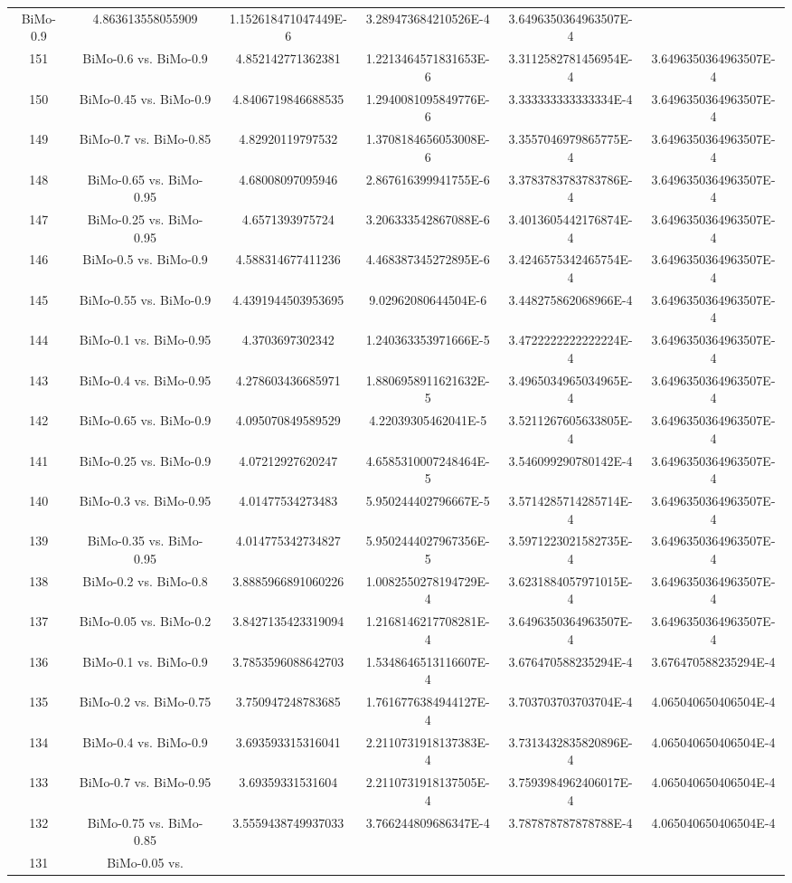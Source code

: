 \documentclass[a4paper,10pt]{article}
\begin{document}
\begin{landscape}
\begin{table}[!htp]
\begin{tabular}{cccccc}
BiMo-0.9&4.863613558055909&1.152618471047449E-6&3.289473684210526E-4&3.6496350364963507E-4\\151&BiMo-0.6 vs. BiMo-0.9&4.852142771362381&1.2213464571831653E-6&3.3112582781456954E-4&3.6496350364963507E-4\\150&BiMo-0.45 vs. BiMo-0.9&4.8406719846688535&1.2940081095849776E-6&3.333333333333334E-4&3.6496350364963507E-4\\149&BiMo-0.7 vs. BiMo-0.85&4.82920119797532&1.3708184656053008E-6&3.3557046979865775E-4&3.6496350364963507E-4\\148&BiMo-0.65 vs. BiMo-0.95&4.68008097095946&2.867616399941755E-6&3.3783783783783786E-4&3.6496350364963507E-4\\147&BiMo-0.25 vs. BiMo-0.95&4.6571393975724&3.206333542867088E-6&3.4013605442176874E-4&3.6496350364963507E-4\\146&BiMo-0.5 vs. BiMo-0.9&4.588314677411236&4.468387345272895E-6&3.4246575342465754E-4&3.6496350364963507E-4\\145&BiMo-0.55 vs. BiMo-0.9&4.4391944503953695&9.02962080644504E-6&3.448275862068966E-4&3.6496350364963507E-4\\144&BiMo-0.1 vs. BiMo-0.95&4.3703697302342&1.240363353971666E-5&3.4722222222222224E-4&3.6496350364963507E-4\\143&BiMo-0.4 vs. BiMo-0.95&4.278603436685971&1.8806958911621632E-5&3.4965034965034965E-4&3.6496350364963507E-4\\142&BiMo-0.65 vs. BiMo-0.9&4.095070849589529&4.22039305462041E-5&3.5211267605633805E-4&3.6496350364963507E-4\\141&BiMo-0.25 vs. BiMo-0.9&4.07212927620247&4.6585310007248464E-5&3.546099290780142E-4&3.6496350364963507E-4\\140&BiMo-0.3 vs. BiMo-0.95&4.01477534273483&5.950244402796667E-5&3.5714285714285714E-4&3.6496350364963507E-4\\139&BiMo-0.35 vs. BiMo-0.95&4.014775342734827&5.9502444027967356E-5&3.5971223021582735E-4&3.6496350364963507E-4\\138&BiMo-0.2 vs. BiMo-0.8&3.8885966891060226&1.0082550278194729E-4&3.6231884057971015E-4&3.6496350364963507E-4\\137&BiMo-0.05 vs. BiMo-0.2&3.8427135423319094&1.2168146217708281E-4&3.6496350364963507E-4&3.6496350364963507E-4\\136&BiMo-0.1 vs. BiMo-0.9&3.7853596088642703&1.5348646513116607E-4&3.676470588235294E-4&3.676470588235294E-4\\135&BiMo-0.2 vs. BiMo-0.75&3.750947248783685&1.7616776384944127E-4&3.703703703703704E-4&4.065040650406504E-4\\134&BiMo-0.4 vs. BiMo-0.9&3.693593315316041&2.2110731918137383E-4&3.7313432835820896E-4&4.065040650406504E-4\\133&BiMo-0.7 vs. BiMo-0.95&3.69359331531604&2.2110731918137505E-4&3.7593984962406017E-4&4.065040650406504E-4\\132&BiMo-0.75 vs. BiMo-0.85&3.5559438749937033&3.766244809686347E-4&3.787878787878788E-4&4.065040650406504E-4\\131&BiMo-0.05 vs. 
\end{tabular}
\end{table}
\end{landscape}
\end{document}
